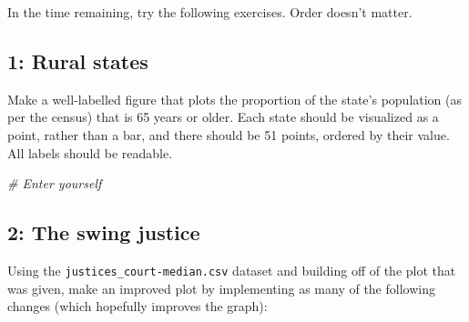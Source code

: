 \documentclass[]{book}
\newenvironment{Shaded}{\begin{snugshade}}{\end{snugshade}}
\newcommand{\CommentTok}[1]{\textcolor[rgb]{0.56,0.35,0.01}{\textit{#1}}}
\theoremstyle{definition}
\theoremstyle{definition}
\theoremstyle{definition}
\theoremstyle{remark}
\begin{document}
In the time remaining, try the following exercises. Order doesn't
matter.

\subsection*{1: Rural states}\label{rural-states}

Make a well-labelled figure that plots the proportion of the state's
population (as per the census) that is 65 years or older. Each state
should be visualized as a point, rather than a bar, and there should be
51 points, ordered by their value. All labels should be readable.

\begin{Shaded}
\begin{Highlighting}[]
\CommentTok{# Enter yourself}
\end{Highlighting}
\end{Shaded}

\subsection*{2: The swing justice}\label{the-swing-justice}

Using the \texttt{justices\_court-median.csv} dataset and building off
of the plot that was given, make an improved plot by implementing as
many of the following changes (which hopefully improves the graph):
\end{document}
